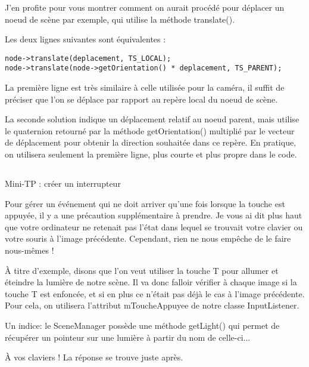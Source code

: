 \documentclass[10pt,a4paper]{report}
\begin{document}
J'en profite pour vous montrer comment on aurait proc\'ed\'e pour d\'eplacer un noeud de sc\`ene par exemple, qui utilise la m\'ethode translate().

Les deux lignes suivantes sont \'equivalentes :


\begin{lstlisting}[caption={}]
node->translate(deplacement, TS_LOCAL);
node->translate(node->getOrientation() * deplacement, TS_PARENT);
\end{lstlisting}


La premi\`ere ligne est tr\`es similaire \`a celle utilis\'ee pour la cam\'era, il suffit de pr\'eciser que l'on se d\'eplace par rapport au rep\`ere local du noeud de sc\`ene.

La seconde solution indique un d\'eplacement relatif au noeud parent, mais utilise le quaternion retourn\'e par la m\'ethode getOrientation() multipli\'e par le vecteur de d\'eplacement pour obtenir la direction souhait\'ee dans ce rep\`ere. En pratique, on utilisera seulement la premi\`ere ligne, plus courte et plus propre dans le code.







\subsection{}
Mini-TP : cr\'eer un interrupteur

Pour g\'erer un \'ev\'enement qui ne doit arriver qu'une fois lorsque la touche est appuy\'ee, il y a une pr\'ecaution suppl\'ementaire \`a prendre. Je vous ai dit plus haut que votre ordinateur ne retenait pas l'\'etat dans lequel se trouvait votre clavier ou votre souris \`a l'image pr\'ec\'edente. Cependant, rien ne nous emp\^eche de le faire nous-m\^emes !

\`A titre d'exemple, disons que l'on veut utiliser la touche T pour allumer et \'eteindre la lumi\`ere de notre sc\`ene. Il va donc falloir v\'erifier \`a chaque image si la touche T est enfonc\'ee, et si en plus ce n'\'etait pas d\'ej\`a le cas \`a l'image pr\'ec\'edente. Pour cela, on utilisera l'attribut mToucheAppuyee de notre classe InputListener.

Un indice: le SceneManager poss\`ede une m\'ethode getLight() qui permet de r\'ecup\'erer un pointeur sur une lumi\`ere \`a partir du nom de celle-ci...

\`A vos claviers ! La r\'eponse se trouve juste apr\`es.
\end{document}
